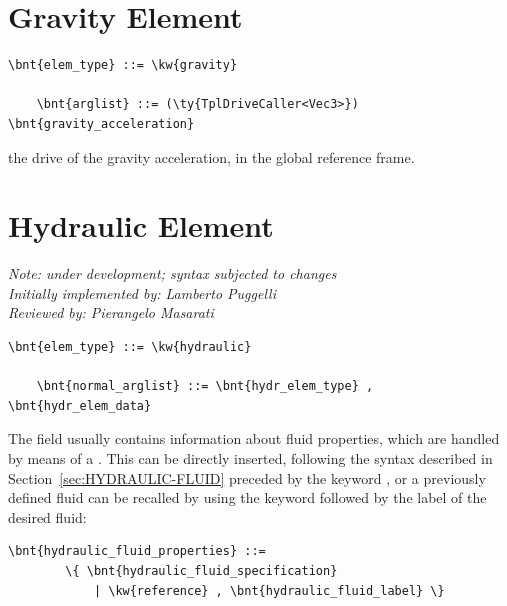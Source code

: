 \section{Gravity Element}
\begin{Verbatim}[commandchars=\\\{\}]
    \bnt{elem_type} ::= \kw{gravity}

    \bnt{arglist} ::= (\ty{TplDriveCaller<Vec3>}) \bnt{gravity_acceleration}
\end{Verbatim}
the drive of the gravity acceleration, in the global reference frame.




\section{Hydraulic Element}
\label{sec:EL:HYDR}
{\em 
    Note: under development; syntax subjected to changes \\
    Initially implemented by: Lamberto Puggelli \\
    Reviewed by: Pierangelo Masarati
}

\begin{Verbatim}[commandchars=\\\{\}]
    \bnt{elem_type} ::= \kw{hydraulic}

    \bnt{normal_arglist} ::= \bnt{hydr_elem_type} , \bnt{hydr_elem_data}
\end{Verbatim}
The field  usually contains information
about fluid properties, which are handled by means of a .
This can be directly inserted, following the syntax described in
Section~\ref{sec:HYDRAULIC-FLUID} preceded by the keyword , or a
previously defined fluid can be recalled by using the keyword 
 followed by the label of the desired fluid:
\begin{Verbatim}[commandchars=\\\{\}]
    \bnt{hydraulic_fluid_properties} ::=
        \{ \bnt{hydraulic_fluid_specification}
            | \kw{reference} , \bnt{hydraulic_fluid_label} \}
\end{Verbatim}

